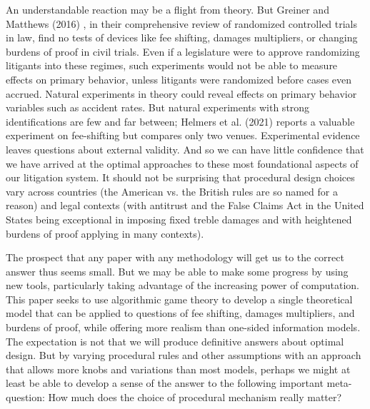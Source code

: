 \documentclass{article}
\begin{document}
An understandable reaction may be a flight from theory. But Greiner and Matthews (2016) \cite{greinermatthews}, in their comprehensive review of randomized controlled trials in law, find no tests of devices like fee shifting, damages multipliers, or changing burdens of proof in civil trials. Even if a legislature were to approve randomizing litigants into these regimes, such experiments would not be able to measure effects on primary behavior, unless litigants were randomized before cases even accrued. Natural experiments in theory could reveal effects on primary behavior variables such as accident rates. But natural experiments with strong identifications are few and far between; Helmers et al. (2021) \cite{helmersetal} reports a valuable experiment on fee-shifting but compares only two venues. Experimental evidence leaves questions about external validity. And so we can have little confidence that we have arrived at the optimal approaches to these most foundational aspects of our litigation system. It should not be surprising that procedural design choices vary across countries (the American vs. the British rules are so named for a reason) and legal contexts (with antitrust and the False Claims Act in the United States being exceptional in imposing fixed treble damages and with heightened burdens of proof applying in many contexts).

The prospect that any paper with any methodology will get us to the correct answer thus seems small. But we may be able to make some progress by using new tools, particularly taking advantage of the increasing power of computation. This paper seeks to use algorithmic game theory to develop a single theoretical model that can be applied to questions of fee shifting, damages multipliers, and burdens of proof, while offering more realism than one-sided information models. The expectation is not that we will produce definitive answers about optimal design. But by varying procedural rules and other assumptions with an approach that allows more knobs and variations than most models, perhaps we might at least be able to develop a sense of the answer to the following important meta-question: How much does the choice of procedural mechanism really matter? 
\end{document}
